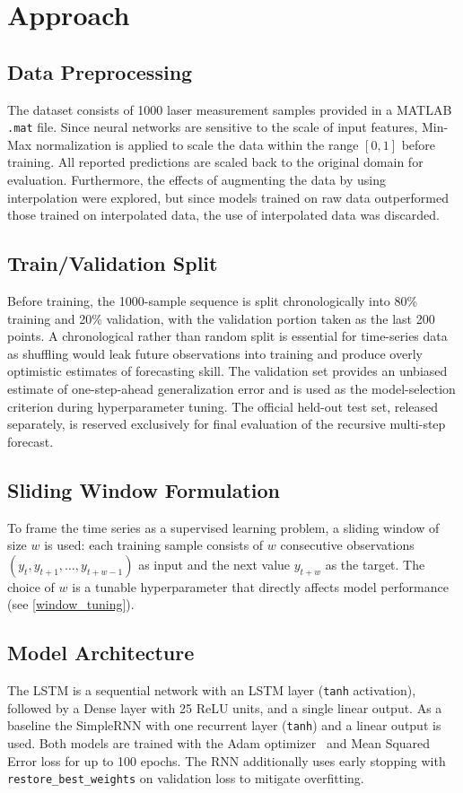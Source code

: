 \documentclass[conference]{IEEEtran}
\begin{document}
\section{Approach}
\label{Approach}

\subsection{Data Preprocessing}
The dataset consists of 1000 laser measurement samples provided in a MATLAB \texttt{.mat} file. Since neural networks are sensitive to the scale of input features, Min-Max normalization is applied to scale the data within the range $[0, 1]$ before training. All reported predictions are scaled back to the original domain for evaluation.
Furthermore, the effects of augmenting the data by using interpolation were explored, but since models trained on raw data outperformed those trained on interpolated data, the use of interpolated data was discarded. 


\subsection{Train/Validation Split}
Before training, the 1000-sample sequence is split chronologically into 80\% training and 20\% validation, with the validation portion taken as the last 200 points. A chronological rather than random split is essential for time-series data as shuffling would leak future observations into training and produce overly optimistic estimates of forecasting skill. The validation set provides an unbiased estimate of one-step-ahead generalization error and is used as the model-selection criterion during hyperparameter tuning. The official held-out test set, released separately, is reserved exclusively for final evaluation of the recursive multi-step forecast.

\subsection{Sliding Window Formulation}
To frame the time series as a supervised learning problem, a sliding window of size $w$ is used: each training sample consists of $w$ consecutive observations $(y_t, y_{t+1}, \ldots, y_{t+w-1})$ as input and the next value $y_{t+w}$ as the target. The choice of $w$ is a tunable hyperparameter that directly affects model performance (see \cref{window_tuning}).

\subsection{Model Architecture}
The LSTM is a sequential network with an LSTM layer (\texttt{tanh} activation), followed by a Dense layer with 25 ReLU units, and a single linear output. As a baseline the SimpleRNN with one recurrent layer (\texttt{tanh}) and a linear output is used. Both models are trained with the Adam optimizer~\cite{b8} and Mean Squared Error loss for up to 100 epochs. The RNN additionally uses early stopping with \texttt{restore\_best\_weights} on validation loss to mitigate overfitting.
\end{document}
